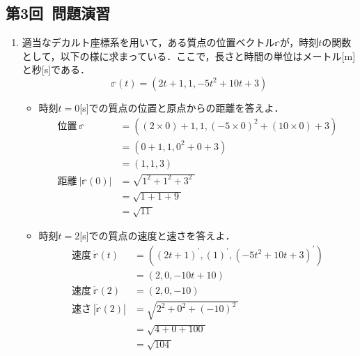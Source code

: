 \documentclass[a4paper,11pt]{ltjsarticle}
\begin{document}
\clearpage

\subsection{第3回\ 問題演習}

  \begin{enumerate}
    \item 適当なデカルト座標系を用いて，ある質点の位置ベクトル$\mathbb{r}$が，時刻$t$の関数として，以下の様に求まっている．ここで，長さと時間の単位はメートル[m]と秒[s]である．
    \begin{equation*}
      \mathbb{r}(t)=(2t+1,1,-5t^{2}+10t+3)
    \end{equation*}
    \begin{itemize}
      \item 時刻$t=0$[s]での質点の位置と原点からの距離を答えよ．
      \begin{equation*}
        \begin{aligned}
          位置\ \mathbb{r} &= ((2 \times 0)+1,1,(-5 \times 0)^{2}+(10 \times 0)+3) \\
                            &= (0+1,1,0^{2}+0+3) \\
                            &= (1,1,3) \\
          距離\ |\mathbb{r}(0)| &= \sqrt{1^{2}+1^{2}+3^{2}\ } \\
                                &= \sqrt{1+1+9\ } \\
                                &= \sqrt{11\ }
        \end{aligned}
      \end{equation*}
      \item 時刻$t=2$[s]での質点の速度と速さを答えよ．
      \begin{equation*}
        \begin{aligned}
          速度\ \dot{\mathbb{r}}(t) &= ((2t+1)^{\prime},(1)^{\prime},(-5t^{2}+10t+3)^{\prime}) \\
                            &= (2,0,-10t+10) \\
        　速度\ \dot{\mathbb{r}}(2) &= (2,0,-10) \\
          速さ\ |\dot{\mathbb{r}}(2)| &= \sqrt{2^{2}+0^{2}+(-10)^{2}\ } \\
                                &= \sqrt{4+0+100\ } \\
                                &= \sqrt{104\ }
        \end{aligned}
      \end{equation*}

\end{itemize}
\end{enumerate}
\end{document}
